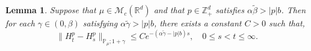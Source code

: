 \documentclass[12pt,a4paper]{amsart}
\theoremstyle{plain}
\newtheorem{lem}[thm]{Lemma}
\theoremstyle{definition}
\numberwithin{equation}{section}
\begin{document}
\begin{lem}
  \label{lem: control of wt}
  Suppose that $\mu\in \mathcal M_c(\mathbb R^d)$ and that $p \in \mathbb Z_+^d$ satisfies $\alpha \tilde \beta > |p|b$.
  Then for each $\gamma \in (0,\beta)$ satisfying $\alpha \tilde \gamma > |p|b$, there exists a constant $C> 0$ such that,
\[
  \|H^p_t-H^p_s\|_{\mathbb{P}_{\mu};1+\gamma}
  \leq C e^{-(\alpha \tilde \gamma-|p|b)s},
  \quad 0 \leq s < t \leq \infty.
\]
\end{lem}
\end{document}
